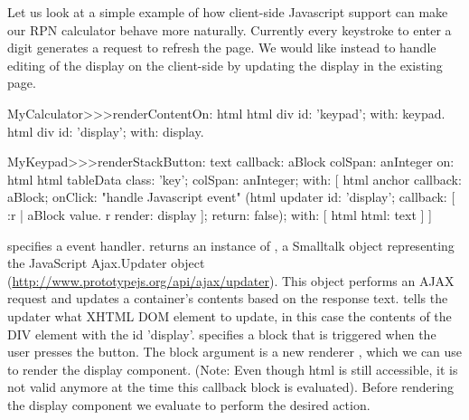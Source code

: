 \documentclass[a4paper,10pt,twoside]{book}
\begin{document}
Let us look at a simple example of how client-side Javascript support can make our RPN calculator behave more naturally.
Currently every keystroke to enter a digit generates a request to refresh the page.
We would like instead to handle editing of the display on the client-side by updating the display in the existing page.


\begin{code}{}
MyCalculator>>>renderContentOn: html
	html div id: 'keypad'; with: keypad.
	html div id: 'display'; with: display.	
\end{code}
				

\begin{code}{}
MyKeypad>>>renderStackButton: text callback: aBlock colSpan: anInteger on: html 
	html tableData
		class: 'key';
		colSpan: anInteger;
		with: [
			html anchor
				callback: aBlock;
				onClick:				"handle Javascript event"
					(html updater
						id: 'display';
						callback: [ :r |
							aBlock value.
							r render: display ];
						return: false);
				with: [ html html: text ] ]
\end{code}

 specifies a  event handler.
 returns an instance of , a Smalltalk object representing the JavaScript Ajax.Updater object (\url{http://www.prototypejs.org/api/ajax/updater}).
This object performs an AJAX request and updates a container's contents based on the response text.
 tells the updater what XHTML DOM element to update, in this case the contents of the DIV element with the id 'display'.
 specifies a block that is triggered when the user presses the button.
The block argument is a new renderer , which we can use to render the display component.
(Note: Even though html is still accessible, it is not valid anymore at the time this callback block is evaluated).
Before rendering the display component we evaluate  to perform the desired action.
\end{document}
